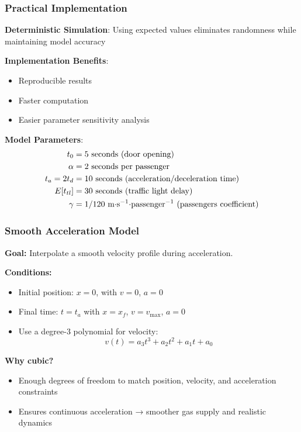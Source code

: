 \documentclass[12pt]{beamer}
\begin{document}
\begin{frame}
\frametitle{Practical Implementation}
\textbf{Deterministic Simulation}: Using expected values eliminates randomness while maintaining model accuracy

\vspace{0.3cm}
\textbf{Implementation Benefits}:
\begin{itemize}
\item Reproducible results
\item Faster computation
\item Easier parameter sensitivity analysis
\end{itemize}

\vspace{0.3cm}
\textbf{Model Parameters}:
\begin{align}
t_0 &= 5 \text{ seconds (door opening)} \notag\\
\alpha &= 2 \text{ seconds per passenger} \notag\\
t_a = 2 t_d &= 10 \text{ seconds (acceleration/deceleration time)} \notag\\
E[t_{tl}] &= 30 \text{ seconds (traffic light delay)} \notag\\
\gamma &= 1 / 120 \text{ m$\cdot$s$^{-1}\cdot$passenger$^{-1}$ (passengers coefficient)} \notag
\end{align}
\end{frame}

\begin{frame}
\frametitle{Smooth Acceleration Model}

\textbf{Goal:} Interpolate a smooth velocity profile during acceleration.

\vspace{0.3cm}
\textbf{Conditions:}
\begin{itemize}
  \item Initial position: $x = 0$, with $v = 0$, $a = 0$
  \item Final time: $t = t_a$ with $x = x_f$, $v = v_{\text{max}}$, $a = 0$
  \item Use a degree-3 polynomial for velocity: $$v(t) = a_3 t^3 + a_2 t^2 + a_1 t + a_0$$
\end{itemize}

\vspace{0.3cm}
\textbf{Why cubic?}
\begin{itemize}
  \item Enough degrees of freedom to match position, velocity, and acceleration constraints
  \item Ensures continuous acceleration → smoother gas supply and realistic dynamics
\end{itemize}
\end{frame}
\end{document}
